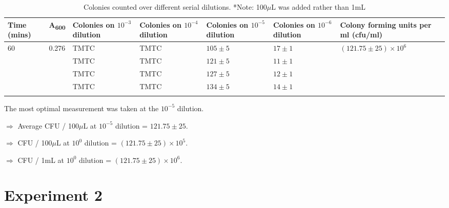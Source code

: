 \documentclass[pdflatex,sn-mathphys]{sn-jnl}%
\theoremstyle{thmstyleone}%
\theoremstyle{thmstyletwo}%
\theoremstyle{thmstylethree}%
\begin{document}
\begin{table}[h]
  \begin{center}
    \caption{Colonies counted over different serial dilutions. *Note: 100$\mu$L was added rather than 1mL}\label{tab:colonies}%
    \begin{tabular}{  m{4em}  m{4em} m{4.5em}  m{4.5em}  m{4.5em} m{4.5em}  m{6em} }
      \toprule
      Time (mins)         & A\textsubscript{600}   & Colonies on $10^{-3}$ dilution & Colonies on $10^{-4}$ dilution & Colonies on $10^{-5}$ dilution & Colonies on $10^{-6}$ dilution & Colony forming units per ml (cfu/ml)           \\
      \midrule
      \multirow{4}{*}{60} & \multirow{4}{*}{0.276} & TMTC                           & TMTC                           & $105\pm5$                      & $17\pm1$                       & \multirow{4}{*}{$(121.75\pm25) \times 10^{6}$} \\
                          &                        & TMTC                           & TMTC                           & $121\pm5$                      & $11\pm1$                       &                                                \\
                          &                        & TMTC                           & TMTC                           & $127\pm5$                      & $12\pm1$                       &                                                \\
                          &                        & TMTC                           & TMTC                           & $134\pm5$                      & $14\pm1$                       &                                                \\
      \botrule

    \end{tabular}
  \end{center}
\end{table}

The most optimal measurement was taken at the $10^{-5}$ dilution.

$\Rightarrow$ Average CFU / 100$\mu$L at $10^{-5}$ dilution = $121.75\pm25$.

$\Rightarrow$ CFU / 100$\mu$L at $10^{0}$ dilution = $(121.75\pm25) \times 10^{5}$.

$\Rightarrow$ CFU / 1mL at $10^{0}$ dilution =  $(121.75\pm25) \times 10^{6}$.

\section{Experiment 2}\label{sec:exp2}
\end{document}
